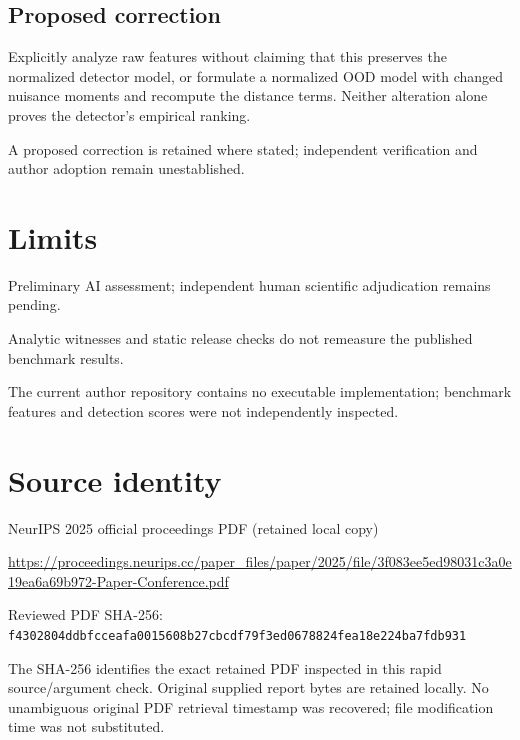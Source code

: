 \documentclass[11pt]{article}
\begin{document}
\subsection*{Proposed correction}

Explicitly analyze raw features without claiming that this preserves the normalized detector model, or formulate a normalized OOD model with changed nuisance moments and recompute the distance terms. Neither alteration alone proves the detector’s empirical ranking.

A proposed correction is retained where stated; independent verification and author adoption remain unestablished.

\section*{Limits}

Preliminary AI assessment; independent human scientific adjudication remains pending.\par

Analytic witnesses and static release checks do not remeasure the published benchmark results.\par

The current author repository contains no executable implementation; benchmark features and detection scores were not independently inspected.\par

\section*{Source identity}

NeurIPS 2025 official proceedings PDF (retained local copy)

\url{https://proceedings.neurips.cc/paper_files/paper/2025/file/3f083ee5ed98031c3a0e19ea6a69b972-Paper-Conference.pdf}

Reviewed PDF SHA-256: \nolinkurl{f4302804ddbfcceafa0015608b27cbcdf79f3ed0678824fea18e224ba7fdb931}

The SHA-256 identifies the exact retained PDF inspected in this rapid source/argument check. Original supplied report bytes are retained locally. No unambiguous original PDF retrieval timestamp was recovered; file modification time was not substituted.
\end{document}
